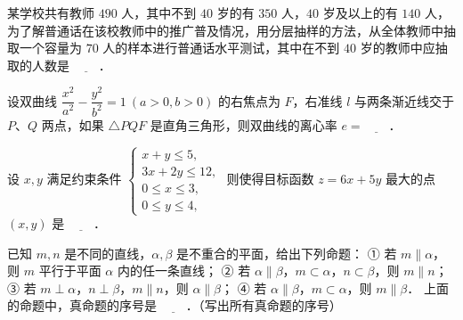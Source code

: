\begin{question}
某学校共有教师 $490$ 人，其中不到 $40$ 岁的有 $350$ 人，$40$ 岁及以上的有 $140$ 人，为了解普通话在该校教师中的推广普及情况，用分层抽样的方法，从全体教师中抽取一个容量为 $70$ 人的样本进行普通话水平测试，其中在不到 $40$ 岁的教师中应抽取的人数是 $\underline{\hspace{2em}}$．

\end{question}
\begin{question}
设双曲线 $\dfrac{x^2}{a^2} - \dfrac{y^2}{b^2} = 1\ (a > 0, b > 0)$ 的右焦点为 $F$，右准线 $l$ 与两条渐近线交于 $P$、$Q$ 两点，如果 $\triangle PQF$ 是直角三角形，则双曲线的离心率 $e = \underline{\hspace{2em}}$．

\end{question}
\begin{question}
设 $x, y$ 满足约束条件 $\begin{cases} x + y \leqslant 5, \\ 3x + 2y \leqslant 12, \\ 0 \leqslant x \leqslant 3, \\ 0 \leqslant y \leqslant 4, \end{cases}$ 则使得目标函数 $z = 6x + 5y$ 最大的点 $(x, y)$ 是 $\underline{\hspace{2em}}$．

\end{question}
\begin{question}
已知 $m, n$ 是不同的直线，$\alpha, \beta$ 是不重合的平面，给出下列命题：
① 若 $m \parallel \alpha$，则 $m$ 平行于平面 $\alpha$ 内的任一条直线；
② 若 $\alpha \parallel \beta$，$m \subset \alpha$，$n \subset \beta$，则 $m \parallel n$；
③ 若 $m \perp \alpha$，$n \perp \beta$，$m \parallel n$，则 $\alpha \parallel \beta$；
④ 若 $\alpha \parallel \beta$，$m \subset \alpha$，则 $m \parallel \beta$．
上面的命题中，真命题的序号是 $\underline{\hspace{2em}}$．（写出所有真命题的序号）

\end{question}


